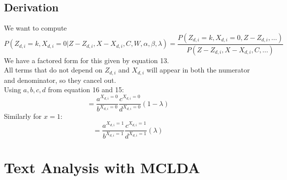 \documentclass[12pt, letterpaper]{article}
\begin{document}
\subsection{Derivation}
    We want to compute\\
    \begin{equation*}
        P(Z_{d,i}=k, X_{d,i}=0 | Z-Z_{d,i}, X-X_{d,i}, C, W, \alpha, \beta, \lambda)
        = \frac{P(Z_{d,i}=k, X_{d,i}=0, Z-Z_{d,i}, \ldots )}
            {P(Z-Z_{d,i}, X-X_{d,i}, C, \ldots) }
    \end{equation*}
    We have a factored form for this given by equation 13.\\
    All terms that do not depend on $Z_{d,i}$ and $X_{d,i}$ will appear in both the numerator and denominator, so they cancel out.\\
    Using $a,b,c,d$ from equation 16 and 15:\\
    \begin{equation*}
        = \frac{a^{X_{d,i}=0}}{b^{X_{d,i}=0}}\frac{c^{X_{d,i}=0}}{d^{X_{d,i}=0}}(1 - \lambda)
    \end{equation*}
    Similarly for $x=1$:\\
    \begin{equation*}
        = \frac{a^{X_{d,i}=1}}{b^{X_{d,i}=1}}\frac{c^{X_{d,i}=1}}{d^{X_{d,i}=1}}(\lambda)
    \end{equation*}

\newpage
\section{Text Analysis with MCLDA}
\end{document}
